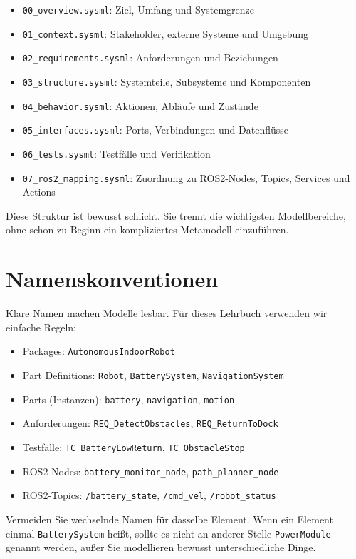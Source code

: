 \begin{itemize}
    \item \texttt{00\_overview.sysml}: Ziel, Umfang und Systemgrenze
    \item \texttt{01\_context.sysml}: Stakeholder, externe Systeme und Umgebung
    \item \texttt{02\_requirements.sysml}: Anforderungen und Beziehungen
    \item \texttt{03\_structure.sysml}: Systemteile, Subsysteme und Komponenten
    \item \texttt{04\_behavior.sysml}: Aktionen, Abläufe und Zustände
    \item \texttt{05\_interfaces.sysml}: Ports, Verbindungen und Datenflüsse
    \item \texttt{06\_tests.sysml}: Testfälle und Verifikation
    \item \texttt{07\_ros2\_mapping.sysml}: Zuordnung zu ROS2-Nodes, Topics, Services und Actions
\end{itemize}

Diese Struktur ist bewusst schlicht. Sie trennt die wichtigsten Modellbereiche, ohne schon zu Beginn ein kompliziertes Metamodell einzuführen.

\section{Namenskonventionen}
Klare Namen machen Modelle lesbar. Für dieses Lehrbuch verwenden wir einfache Regeln:

\begin{itemize}
    \item Packages: \texttt{AutonomousIndoorRobot}
    \item Part Definitions: \texttt{Robot}, \texttt{BatterySystem}, \texttt{NavigationSystem}
    \item Parts (Instanzen): \texttt{battery}, \texttt{navigation}, \texttt{motion}
    \item Anforderungen: \texttt{REQ\_DetectObstacles}, \texttt{REQ\_ReturnToDock}
    \item Testfälle: \texttt{TC\_BatteryLowReturn}, \texttt{TC\_ObstacleStop}
    \item ROS2-Nodes: \texttt{battery\_monitor\_node}, \texttt{path\_planner\_node}
    \item ROS2-Topics: \texttt{/battery\_state}, \texttt{/cmd\_vel}, \texttt{/robot\_status}
\end{itemize}

Vermeiden Sie wechselnde Namen für dasselbe Element. Wenn ein Element einmal \texttt{BatterySystem} heißt, sollte es nicht an anderer Stelle \texttt{PowerModule} genannt werden, außer Sie modellieren bewusst unterschiedliche Dinge.

